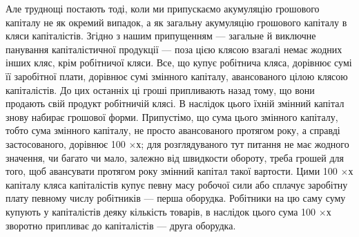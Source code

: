 Але труднощі постають тоді, коли ми припускаємо акумуляцію грошового
капіталу не як окремий випадок, а як загальну акумуляцію грошового
капіталу в кляси капіталістів. Згідно з нашим припущенням —
загальне й виключне панування капіталістичної продукції — поза цією
клясою взагалі немає жодних інших кляс, крім робітничої кляси. Все,
що купує робітнича кляса, дорівнює сумі її заробітної плати, дорівнює
сумі змінного капіталу, авансованого цілою клясою капіталістів. До цих
останніх ці гроші припливають назад тому, що вони продають свій
продукт робітничій клясі. В наслідок цього їхній змінний капітал знову
набирає грошової форми. Припустімо, що сума цього змінного капіталу,
тобто сума змінного капіталу, не просто авансованого протягом року, а
справді застосованого, дорівнює 100 $× х$; для розглядуваного тут
питання не має жодного значення, чи багато чи мало, залежно від швидкости
обороту, треба грошей для того, щоб авансувати протягом року
змінний капітал такої вартости. Цими 100 $× х$ капіталу кляса капіталістів
купує певну масу робочої сили або сплачує заробітну плату
певному числу робітників — перша оборудка. Робітники на цю саму суму
купують у капіталістів деяку кількість товарів, в наслідок цього сума
100 $× х$ зворотно припливає до капіталістів — друга оборудка.
\parbreak{}  %
